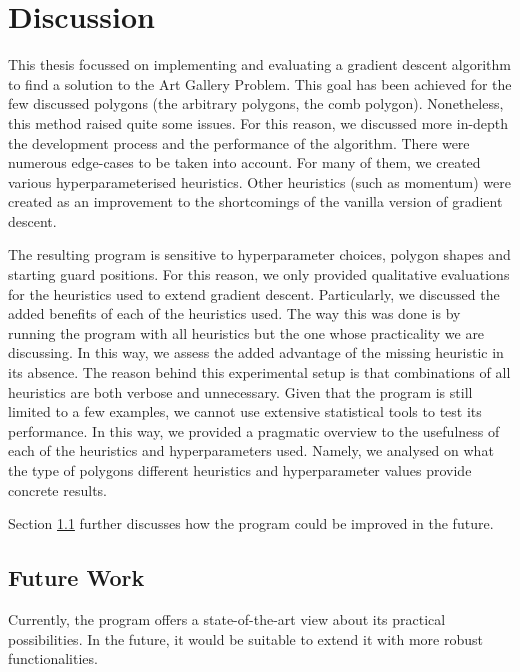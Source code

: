 \section{Discussion}
This thesis focussed on implementing and evaluating a gradient descent algorithm to find a solution to the Art Gallery Problem. This goal has been achieved for the few discussed polygons (the arbitrary polygons, the comb polygon). 
Nonetheless, this method raised quite some issues. For this reason, we discussed more in-depth the development process and the performance of the algorithm. There were numerous edge-cases to be taken into account. For many of them, we created various hyperparameterised heuristics. Other heuristics (such as momentum) were created as an improvement to the shortcomings of the vanilla version of gradient descent.

The resulting program is sensitive to hyperparameter choices, polygon shapes and starting guard positions. For this reason, we only provided qualitative evaluations for the heuristics used to extend gradient descent. Particularly, we discussed the added benefits of each of the heuristics used. The way this was done is by running the program with all heuristics but the one whose practicality we are discussing. In this way, we assess the added advantage of the missing heuristic in its absence. The reason behind this experimental setup is that combinations of all heuristics are both verbose and unnecessary. Given that the program is still limited to a few examples, we cannot use extensive statistical tools to test its performance.
In this way, we provided a pragmatic overview to the usefulness of each of the heuristics and hyperparameters used. Namely, we analysed on what the type of polygons different heuristics and hyperparameter values provide concrete results.

Section \ref{sec:future} further discusses how the program could be improved in the future.




\subsection{Future Work}
\label{sec:future}
Currently, the program offers a state-of-the-art view about its practical possibilities.
In the future, it would be suitable to extend it with more robust functionalities.

